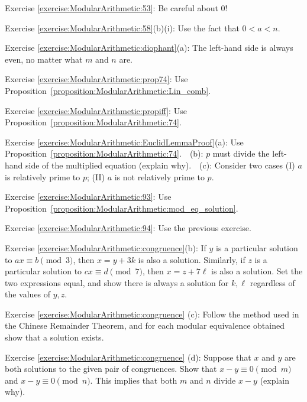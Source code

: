 \noindent Exercise \ref{exercise:ModularArithmetic:53}: Be careful about 0!

\noindent Exercise \ref{exercise:ModularArithmetic:58}(b)(i): Use the fact that $0 < a < n$.

\noindent Exercise \ref{exercise:ModularArithmetic:diophant}(a): The left-hand side is always even, no matter what $m$ and $n$ are.

\noindent Exercise \ref{exercise:ModularArithmetic:prop74}: Use Proposition~\ref{proposition:ModularArithmetic:Lin_comb}.

\noindent Exercise \ref{exercise:ModularArithmetic:propiff}: Use Proposition~\ref{proposition:ModularArithmetic:74}.

\noindent Exercise \ref{exercise:ModularArithmetic:EuclidLemmaProof}(a): Use  Proposition~\ref{proposition:ModularArithmetic:74}.~~(b): $p$ must divide the left-hand side of the multiplied equation (explain why).~~(c): Consider two cases (I) $a$ is relatively prime to $p$; (II) $a$ is not relatively prime to $p$.

\noindent Exercise \ref{exercise:ModularArithmetic:93}: Use Proposition~\ref{proposition:ModularArithmetic:mod_eq_solution}. 

\noindent Exercise \ref{exercise:ModularArithmetic:94}: Use the previous exercise.

\noindent Exercise \ref{exercise:ModularArithmetic:congruence}(b):  If  $y$ is a particular solution to $ax \equiv b \pmod 3$, then $x=y+3k$ is also a solution. Similarly, if $z$ is 
 a particular solution to $cx \equiv d \pmod 7$, then $x=z+7\ell$ is also a solution. Set the two expressions equal, and show there is always a solution for $k, \ell$ regardless of the values of $y,z$.

\noindent Exercise \ref{exercise:ModularArithmetic:congruence}  (c): Follow the method used in the Chinese Remainder Theorem, and for each modular equivalence obtained show that a solution exists.

\noindent Exercise \ref{exercise:ModularArithmetic:congruence}  (d): Suppose that $x$ and $y$ are both solutions to the given pair of congruences. Show that 
$ x-y \equiv 0 \pmod{m}$ and $x-y \equiv 0 \pmod{n}$. This implies that both $m$ and $n$ divide $x-y$ (explain why).